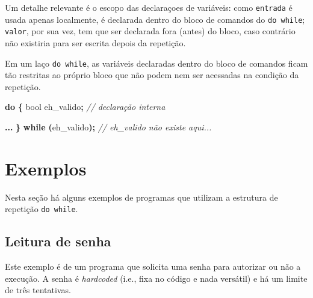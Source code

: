 \documentclass[
  11pt,
  a4paper,
]{scrbook}
\newenvironment{Shaded}{\begin{snugshade}}{\end{snugshade}}
\newcommand{\CommentTok}[1]{\textcolor[rgb]{0.56,0.35,0.01}{\textit{#1}}}
\newcommand{\ControlFlowTok}[1]{\textcolor[rgb]{0.13,0.29,0.53}{\textbf{#1}}}
\newcommand{\DataTypeTok}[1]{\textcolor[rgb]{0.13,0.29,0.53}{#1}}
\newcommand{\NormalTok}[1]{#1}
\newcommand{\OperatorTok}[1]{\textcolor[rgb]{0.81,0.36,0.00}{\textbf{#1}}}
\begin{document}
Um detalhe relevante é o escopo das declaraçoes de variáveis: como
\texttt{entrada} é usada apenas localmente, é declarada dentro do bloco
de comandos do \texttt{do\ while}; \texttt{valor}, por sua vez, tem que
ser declarada fora (antes) do bloco, caso contrário não existiria para
ser escrita depois da repetição.

\begin{tcolorbox}[enhanced jigsaw, arc=.35mm, bottomtitle=1mm, colbacktitle=quarto-callout-warning-color!10!white, title=\textcolor{quarto-callout-warning-color}{\faExclamationTriangle}\hspace{0.5em}{Curiosidade}, toprule=.15mm, left=2mm, opacityback=0, colback=white, colframe=quarto-callout-warning-color-frame, opacitybacktitle=0.6, bottomrule=.15mm, leftrule=.75mm, toptitle=1mm, coltitle=black, titlerule=0mm, rightrule=.15mm, breakable]

Em um laço \texttt{do\ while}, as variáveis declaradas dentro do bloco
de comandos ficam tão restritas ao próprio bloco que não podem nem ser
acessadas na condição da repetição.

\begin{Shaded}
\begin{Highlighting}[]
\ControlFlowTok{do} \OperatorTok{\{}
    \DataTypeTok{bool}\NormalTok{ eh\_valido}\OperatorTok{;}  \CommentTok{// declaração interna}

    \OperatorTok{...}
\OperatorTok{\}} \ControlFlowTok{while} \OperatorTok{(}\NormalTok{eh\_valido}\OperatorTok{);}  \CommentTok{// \textasciigrave{}eh\_valido\textasciigrave{} não existe aqui...}
\end{Highlighting}
\end{Shaded}

\end{tcolorbox}

\section{Exemplos}\label{exemplos-2}

Nesta seção há alguns exemplos de programas que utilizam a estrutura de
repetição \texttt{do\ while}.

\subsection{Leitura de senha}\label{leitura-de-senha}

Este exemplo é de um programa que solicita uma senha para autorizar ou
não a execução. A senha é \emph{hardcoded} (i.e., fixa no código e nada
versátil) e há um limite de três tentativas.
\end{document}
